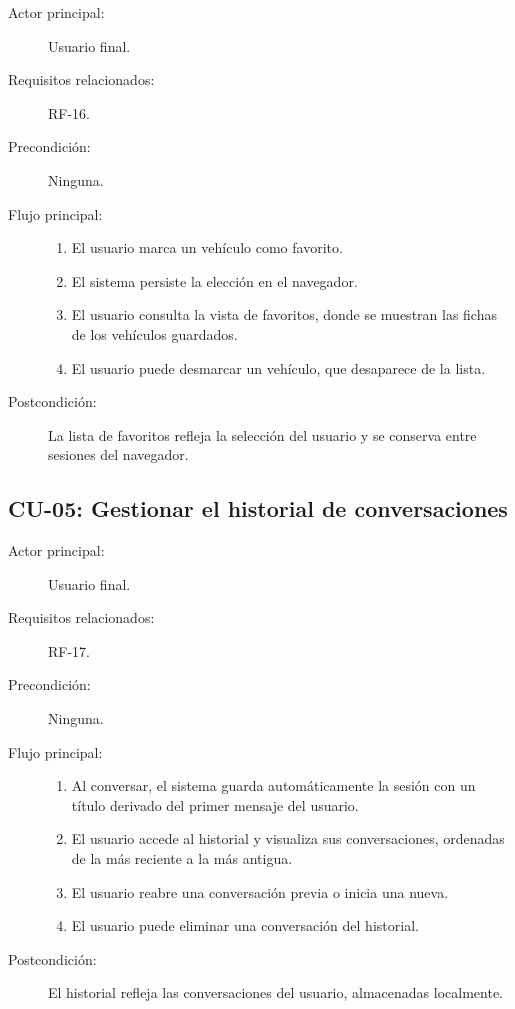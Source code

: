 \begin{description}
  \item[Actor principal:] Usuario final.
  \item[Requisitos relacionados:] RF-16.
  \item[Precondición:] Ninguna.
  \item[Flujo principal:]
        \begin{enumerate}
          \item El usuario marca un vehículo como favorito.
          \item El sistema persiste la elección en el navegador.
          \item El usuario consulta la vista de favoritos, donde se muestran
                las fichas de los vehículos guardados.
          \item El usuario puede desmarcar un vehículo, que desaparece de la
                lista.
        \end{enumerate}
  \item[Postcondición:] La lista de favoritos refleja la selección del usuario y
        se conserva entre sesiones del navegador.
\end{description}

\subsection{CU-05: Gestionar el historial de conversaciones}

\begin{description}
  \item[Actor principal:] Usuario final.
  \item[Requisitos relacionados:] RF-17.
  \item[Precondición:] Ninguna.
  \item[Flujo principal:]
        \begin{enumerate}
          \item Al conversar, el sistema guarda automáticamente la sesión con un
                título derivado del primer mensaje del usuario.
          \item El usuario accede al historial y visualiza sus conversaciones,
                ordenadas de la más reciente a la más antigua.
          \item El usuario reabre una conversación previa o inicia una nueva.
          \item El usuario puede eliminar una conversación del historial.
        \end{enumerate}
  \item[Postcondición:] El historial refleja las conversaciones del usuario,
        almacenadas localmente.
\end{description}

